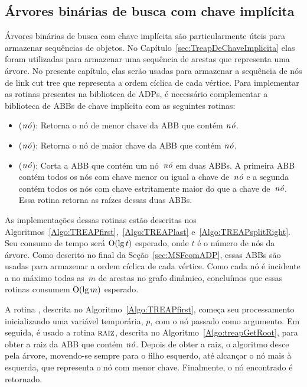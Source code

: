\subsection{Árvores binárias de busca com chave implícita}
\label{sec:extrastructABB}

Árvores binárias de busca com chave implícita são particularmente úteis para armazenar sequências de objetos.
No Capítulo~\ref{sec:TreapDeChaveImplicita} elas foram utilizadas para armazenar uma sequência de arestas que representa uma árvore.
No presente capítulo, elas serão usadas para armazenar a sequência de nós de link cut tree que representa a ordem cíclica de cada vértice.
Para implementar as rotinas presentes na biblioteca de ADPs, é necessário complementar a biblioteca de ABBs de chave implícita com as seguintes rotinas:
\begin{itemize}
\item \treapFirst($\mathit{n\acute{o}}$): Retorna o nó de menor chave da ABB que contém $\mathit{n\acute{o}}$.
\item \treapLast($\mathit{n\acute{o}}$): Retorna o nó de maior chave da ABB que contém $\mathit{n\acute{o}}$.
\item \treapSplitRight($\mathit{n\acute{o}}$): Corta a ABB que contém um nó~$\mathit{n\acute{o}}$ em duas ABBs. A primeira ABB contém todos os nós com chave menor ou igual a chave de~$\mathit{n\acute{o}}$ e a segunda contém todos os nós com chave estritamente maior do que a chave de~$\mathit{n\acute{o}}$. Essa rotina retorna as raízes dessas duas ABBs.
\end{itemize}

As implementações dessas rotinas estão descritas nos Algoritmos~\ref{Algo:TREAPfirst},~\ref{Algo:TREAPlast} e~\ref{Algo:TREAPsplitRight}.
Seu consumo de tempo será $\mathrm{O}(\lg t)$ esperado, onde $t$ é o número de nós da árvore.
Como descrito no final da Seção~\ref{sec:MSFcomADP}, essas ABBs são usadas para armazenar a ordem cíclica de cada vértice.
Como cada nó é incidente a no máximo todas as~$m$ de arestas no grafo dinâmico, concluímos que essas rotinas consumem $\mathrm{O}(\lg m)$ esperado.  

A rotina \treapFirst{}, descrita no Algoritmo~\ref{Algo:TREAPfirst}, começa seu processamento inicializando uma variável temporária, $p$, com o nó passado como argumento.
Em seguida, é usado a rotina $\text{\scshape raiz}$, descrita no Algoritmo~\ref{Algo:treapGetRoot}, para obter a raiz da ABB que contém $\mathit{n\acute{o}}$.
Depois de obter a raiz, o algoritmo desce pela árvore, movendo-se sempre para o filho esquerdo, até alcançar o nó mais à esquerda, que representa o nó com menor chave.
Finalmente, o nó encontrado é retornado.

